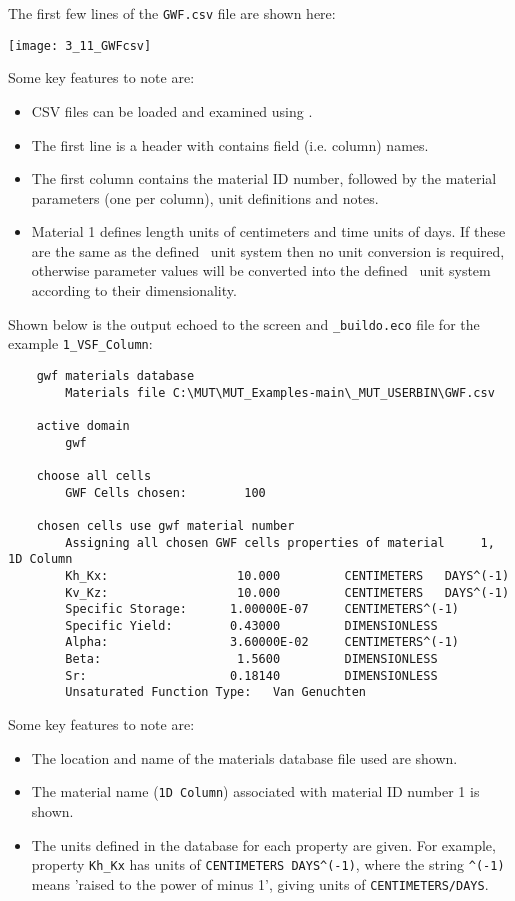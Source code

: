 {The first few lines of the \texttt{GWF.csv} file are shown here:

    \texttt{[image: 3\_11\_GWFcsv]}

Some key features to note are:
\begin{itemize}
    \item CSV files can be loaded and examined using \excel.
    \item The first line is a header with contains field (i.e. column) names.
    \item The first column contains the material ID number, followed by the material parameters (one per column), unit definitions and notes.
    \item Material 1 defines length units of centimeters and time units of days.  If these are the same as the defined \mfus\ unit system then no unit conversion is required, otherwise parameter values will be converted into the defined \mfus\ unit system according to their dimensionality.
\end{itemize}

Shown below is the output echoed to the screen and \texttt{\_buildo.eco} file for the example \texttt{1\_VSF\_Column}: \begin{verbatim}
    gwf materials database
        Materials file C:\MUT\MUT_Examples-main\_MUT_USERBIN\GWF.csv

    active domain
        gwf

    choose all cells
        GWF Cells chosen:        100

    chosen cells use gwf material number
        Assigning all chosen GWF cells properties of material     1, 1D Column
        Kh_Kx:                  10.000         CENTIMETERS   DAYS^(-1)
        Kv_Kz:                  10.000         CENTIMETERS   DAYS^(-1)
        Specific Storage:      1.00000E-07     CENTIMETERS^(-1)
        Specific Yield:        0.43000         DIMENSIONLESS
        Alpha:                 3.60000E-02     CENTIMETERS^(-1)
        Beta:                   1.5600         DIMENSIONLESS
        Sr:                    0.18140         DIMENSIONLESS
        Unsaturated Function Type:   Van Genuchten

\end{verbatim}
Some key features to note are:
\begin{itemize}
    \item The location and name of the materials database file used are shown.
    \item The material name (\texttt{1D Column}) associated with material ID number 1 is shown.
    \item The units defined in the database for each property are given. For example, property  \texttt{Kh\_Kx} has units of \verb+CENTIMETERS DAYS^(-1)+, where the string \verb+^(-1)+ means 'raised to the power of minus 1', giving units of \verb+CENTIMETERS/DAYS+.
\end{itemize}

}
